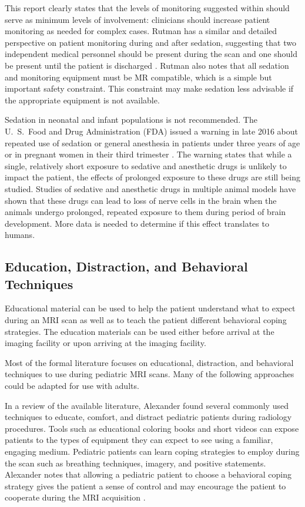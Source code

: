 \noindent This report clearly states that the levels of monitoring suggested within should serve as minimum levels of involvement: clinicians should increase patient monitoring as needed for complex cases. Rutman has a similar and detailed perspective on patient monitoring during and after sedation, suggesting that two independent medical personnel should be present during the scan and one should be present until the patient is discharged \cite{Rutman2009}. Rutman also notes that all sedation and monitoring equipment must be MR compatible, which is a simple but important safety constraint. This constraint may make sedation less advisable if the appropriate equipment is not available.

Sedation in neonatal and infant populations is not recommended. The  U.~S.~Food and Drug Administration (FDA) issued a warning in late 2016 about repeated use of sedation or general anesthesia in patients under three years of age or in pregnant women in their third trimester \cite{FDA2016}. The warning states that while a single, relatively short exposure to sedative and anesthetic drugs is unlikely to impact the patient, the effects of prolonged exposure to these drugs are still being studied. Studies of sedative and anesthetic drugs in multiple animal models have shown that these drugs can lead to loss of nerve cells in the brain when the animals undergo prolonged, repeated exposure to them during period of brain development. More data is needed to determine if this effect translates to humans.

\subsection{Education, Distraction, and Behavioral Techniques}

Educational material can be used to help the patient understand what to expect during an MRI scan as well as to teach the patient different behavioral coping strategies. The education materials can be used either before arrival at the imaging facility or upon arriving at the imaging facility. 

Most of the formal literature focuses on educational, distraction, and behavioral techniques to use during pediatric MRI scans. Many of the following approaches could be adapted for use with adults.

In a review of the available literature, Alexander found several commonly used techniques to educate, comfort, and distract pediatric patients during radiology procedures. Tools such as educational coloring books and short videos can expose patients to the types of equipment they can expect to see using a familiar, engaging medium. Pediatric patients can learn coping strategies to employ during the scan such as breathing techniques, imagery, and positive statements. Alexander notes that allowing a pediatric patient to choose a behavioral coping strategy gives the patient a sense of control and may encourage the patient to cooperate during the MRI acquisition \cite{Alexander2012}.

